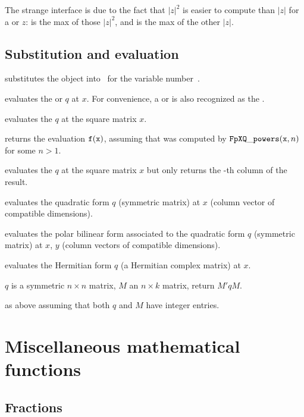 The strange interface is due to the fact that $|z|^2$ is easier to compute
than $|z|$ for a  or  $z$:  is the max of
those $|z|^2$, and  is the max of the other $|z|$.

\section{Substitution and evaluation}

 substitutes the object 
into~ for the variable number~.

 evaluates the  or 
$q$ at $x$. For convenience, a  or  is also recognized as
the  .

 evaluates the  $q$ at the
square matrix $x$.

 returns
the evaluation ${\tt f}({\tt x})$, assuming that  was computed by
${\tt FpXQ\_powers}({\tt x}, n)$ for some $n>1$.

 evaluates the  $q$
at the square matrix $x$ but only returns the -th column of the result.

 evaluates the quadratic form
$q$ (symmetric matrix) at $x$ (column vector of compatible dimensions).

 evaluates the polar bilinear form
associated to the quadratic form $q$ (symmetric matrix) at $x$, $y$ (column
vectors of compatible dimensions).

 evaluates the Hermitian form $q$
(a Hermitian complex matrix) at $x$.

 $q$ is a symmetric $n\times n$ matrix,
$M$ an $n\times k$ matrix, return $M' q M$.

 as above assuming that both
$q$ and $M$ have integer entries.

\newpage
\chapter{Miscellaneous mathematical functions}

\section{Fractions}

